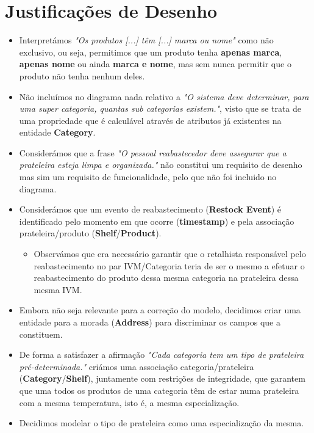 \documentclass[12pt,a4paper]{article}
\begin{document}
  \section*{Justificações de Desenho}
  \normalsize
  \begin{itemize}
    \item Interpretámos \textit{"Os produtos [...] têm [...] marca ou nome"}
      como não exclusivo, ou seja, permitimos que um produto tenha \textbf{apenas marca},
      \textbf{apenas nome} ou ainda \textbf{marca e nome}, mas sem nunca
      permitir que o produto não tenha nenhum deles.
    \item Não incluímos no diagrama nada relativo a
      \textit{"O sistema deve determinar, para uma super categoria, quantas sub categorias existem."},
      visto que se trata de uma propriedade que é calculável através de
      atributos já existentes na entidade \textbf{Category}.
    \item Considerámos que a frase
      \textit{"O pessoal reabastecedor deve assegurar que a prateleira esteja limpa e organizada."}
      não constitui um requisito de desenho mas sim um requisito de funcionalidade,
      pelo que não foi incluido no diagrama.
    \item Considerámos que um evento de reabastecimento (\textbf{Restock Event}) é
      identificado pelo momento em que ocorre (\textbf{timestamp}) e pela associação
      prateleira/produto (\textbf{Shelf}/\textbf{Product}).
    \begin{itemize}
      \item Observámos que era necessário garantir que o retalhista responsável pelo
        reabastecimento no par IVM/Categoria teria de ser o mesmo a efetuar o
        reabastecimento do produto dessa mesma categoria na prateleira dessa mesma IVM.
    \end{itemize}
    \item Embora não seja relevante para a correção do modelo, decidimos criar uma
      entidade para a morada (\textbf{Address}) para discriminar os campos que a constituem.
    \item De forma a satisfazer a afirmação
      \textit{"Cada categoria tem um tipo de prateleira pré-determinada."}
      criámos uma associação categoria/prateleira (\textbf{Category}/\textbf{Shelf}),
      juntamente com restrições de integridade, que garantem que uma todos os produtos
      de uma categoria têm de estar numa prateleira com a mesma temperatura, isto é,
      a mesma especialização.
    \item Decidimos modelar o tipo de prateleira como uma especialização da mesma.

\end{itemize}
\end{document}
